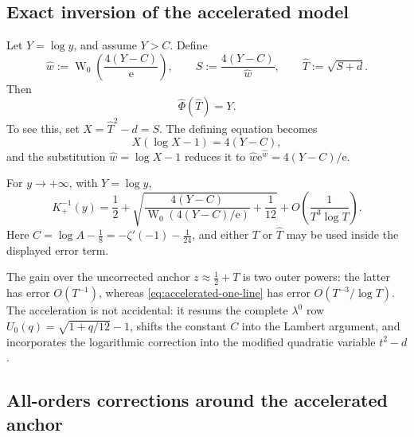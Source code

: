 \documentclass[11pt,oneside]{article}
\theoremstyle{plain}
\theoremstyle{definition}
\theoremstyle{remark}
\newcommand{\W}{\operatorname{W}}
\newcommand{\e}{\mathrm{e}}
\begin{document}
\subsection{Exact inversion of the accelerated model}

Let \(Y=\log y\), and assume \(Y>C\).  Define
\begin{equation}
 \widehat w:=\W_0\!\left(\frac{4(Y-C)}{\e}\right),
 \qquad
 S:=\frac{4(Y-C)}{\widehat w},
 \qquad
 \widehat T:=\sqrt{S+d}.
 \label{eq:accelerated-anchor-def}
\end{equation}
Then
\begin{equation}
 \widehat\Phi(\widehat T)=Y.
 \label{eq:Phihat-inversion}
\end{equation}
To see this, set \(X=\widehat T^2-d=S\).  The defining equation becomes
\begin{equation}
 X(\log X-1)=4(Y-C),
 \label{eq:X-logX-accelerated}
\end{equation}
and the substitution \(\widehat w=\log X-1\) reduces it to
\(\widehat w\e^{\widehat w}=4(Y-C)/\e\).

\begin{mainbox}[title={Accelerated one-line inverse}]
For \(y\to+\infty\), with \(Y=\log y\),
\begin{equation}
 \boxed{
 K_+^{-1}(y)
 =\frac12+
 \sqrt{\frac{4(Y-C)}{\W_0(4(Y-C)/\e)}+\frac1{12}}
 +O\!\left(\frac{1}{T^3\log T}\right).}
 \label{eq:accelerated-one-line}
\end{equation}
Here \(C=\log A-\tfrac18=-\zeta'(-1)-\tfrac1{24}\), and either \(T\) or
\(\widehat T\) may be used inside the displayed error term.
\end{mainbox}

The gain over the uncorrected anchor \(z\approx\tfrac12+T\) is two outer
powers: the latter has error \(O(T^{-1})\), whereas
\cref{eq:accelerated-one-line} has error \(O(T^{-3}/\log T)\).  The
acceleration is not accidental: it resums the complete \(\lambda^0\) row
\(U_0(q)=\sqrt{1+q/12}-1\), shifts the constant \(C\) into the Lambert
argument, and incorporates the logarithmic correction into the modified
quadratic variable \(t^2-d\).

\subsection{All-orders corrections around the accelerated anchor}
\end{document}
